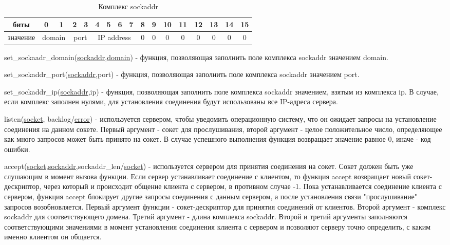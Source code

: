 \documentclass[12t,english,russian]{article}
\begin{document}
\begin{table}[H]
\caption{\label{sockaddr}Комплекс sockaddr}
\begin{center}
\begin{tabular}{|c|c|c|c|c|c|c|c|c|c|c|c|c|c|c|c|c|}
\hline
биты & 0 & 1 & 2 & 3 & 4 & 5 & 6 & 7 & 8 & 9 & 10 & 11 & 12 & 13 & 14 & 15 \\
\hline
значение & \multicolumn{2}{|c|}{domain} & \multicolumn{2}{|c|}{port} & \multicolumn{4}{|c|}{IP address} & 0 & 0 & 0 & 0 & 0 & 0 & 0 & 0 \\
\hline
\end{tabular}
\end{center}
\end{table}

\label{set_sockaddr_domain}
set\_sockaadr\_domain(\hyperref[sockaddr]{sockaddr},\hyperref[domain]{domain}) - функция, позволяющая заполнить поле комплекса sockaddr значением domain.

\label{set_sockaddr_port}
set\_sockaddr\_port(\hyperref[sockaddr]{sockaddr},port) - функция, позволяющая заполнить поле комплекса sockaddr значением port.

\label{set_sockaddr_ip}
set\_sockaddr\_ip(\hyperref[sockaddr]{sockaddr},ip) - функция, позволяющая заполнить поле комплекса sockaddr значением, взятым из комплекса ip. В случае, если комплекс заполнен нулями, для установления соединения будут использованы все IP-адреса сервера.

\label{listen}
listen(\hyperref[socket]{socket}, backlog/\hyperref[error]{error}) - используется сервером, чтобы уведомить операционную систему, что он ожидает запросы на установление соединения на данном сокете. Первый аргумент - сокет для прослушивания, второй аргумент - целое положительное число, определяющее как много запросов может быть принято на сокет. В случае успешного выполнения функция возвращает значение равное 0, иначе - код ошибки.

\label{accept}
accept(\hyperref[socket]{socket},\hyperref[sockaddr]{sockaddr},sockaddr\_len/\hyperref[socket]{socket}) - используется сервером для принятия соединения на сокет. Сокет должен быть уже слушающим в момент вызова функции. Если сервер устанавливает соединение с клиентом, то функция accept возвращает новый сокет-дескриптор, через который и происходит общение клиента с сервером, в противном случае -1. Пока устанавливается соединение клиента с сервером, функция accept блокирует другие запросы соединения с данным сервером, а после установления связи "прослушивание" запросов возобновляется. Первый аргумент функции - сокет-дескриптор для принятия соединений от клиентов. Второй аргумент - комплекс sockaddr для соответствующего домена. Третий аргумент - длина комплекса sockaddr. Второй и третий аргументы заполняются соответствующими значениями в момент установления соединения клиента с сервером и позволяют серверу точно определить, с каким именно клиентом он общается.
\end{document}
